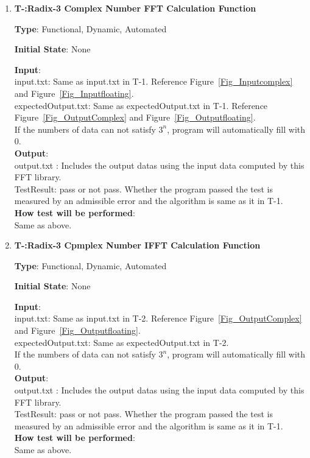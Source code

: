 \documentclass[12pt, titlepage]{article}
\newcounter{tnum}
\begin{document}
\begin{enumerate}

\item{\textbf{T-\thetnum \label{R3CFFT}:Radix-3 Complex  Number FFT Calculation Function}}

\textbf {Type}: Functional, Dynamic, Automated

\textbf {Initial State}: None
					
\textbf {Input}:\\
{\large input.txt}: Same as input.txt in T-1. Reference   Figure~\ref{Fig_Inputcomplex} and Figure~\ref{Fig_Inputfloating}.\\
{\large expectedOutput.txt}: Same as  expectedOutput.txt in T-1.  Reference Figure~\ref{Fig_OutputComplex} and Figure~\ref{Fig_Outputfloating}.\\
If the numbers of data can not satisfy $3^n$, program will automatically fill with 0.\\
					
\textbf {Output}: \\{\large output.txt} : Includes the output datas using the input data computed by this FFT library.\\
{\large TestResult}: pass or not pass. Whether the program passed the test is measured by an admissible error and the algorithm is same as it in T-1.\\
		
\textbf {How test will be performed}: \\
Same as above.

\item{\textbf{T-\thetnum \label{R3CIFFT}:Radix-3 Cpmplex Number IFFT Calculation Function}}

\textbf {Type}: Functional, Dynamic, Automated
					
\textbf {Initial State}: None
					
\textbf {Input}:\\
{\large input.txt}: Same as input.txt in T-2. Reference Figure~\ref{Fig_OutputComplex} and Figure~\ref{Fig_Outputfloating}.\\
{\large expectedOutput.txt}: Same as  expectedOutput.txt in T-2. \\
If the numbers of data can not satisfy $3^n$, program will automatically fill with 0.\\
					
\textbf {Output}: \\{\large output.txt} : Includes the output datas using the input data computed by this FFT library.\\
{\large TestResult}: pass or not pass. Whether the program passed the test is measured by an admissible error and the algorithm is same as it in T-1.\\

\textbf {How test will be performed}: \\
Same as above.
\end{enumerate}
\end{document}
